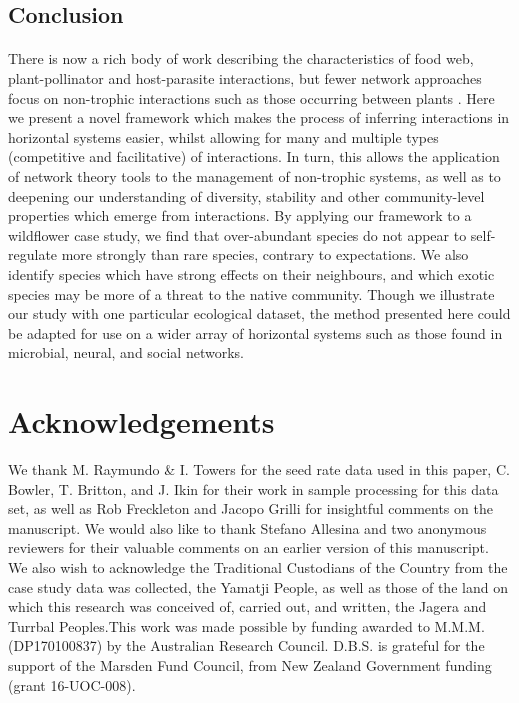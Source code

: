 \documentclass[a4,12pt]{article}
\begin{document}
\subsection{Conclusion}

    \paragraph{} 
    There is now a rich body of work describing the characteristics of food web, plant-pollinator and host-parasite interactions, but fewer network approaches focus on non-trophic interactions such as those occurring between plants \parencite{Ellison2019}. Here we present a novel framework which makes the process of inferring  interactions in horizontal systems easier, whilst allowing for many and multiple types (competitive and facilitative) of interactions. In turn, this allows the application of  network theory tools to the management of non-trophic systems, as well as to deepening our understanding of diversity, stability and other community-level properties which emerge from interactions. By applying our framework to a wildflower case study, we find that over-abundant species do not appear to self-regulate more strongly than rare species, contrary to expectations. We also identify species which have strong effects on their neighbours, and which exotic species may be more of a threat to the native community. Though we illustrate our study with one particular ecological dataset, the method presented here could be adapted for use on a wider array of  horizontal systems such as those found in microbial, neural, and social networks. 
   

% 
% 

\section*{Acknowledgements}

We thank M. Raymundo \& I. Towers for the seed rate data used in this paper, C. Bowler, T. Britton, and J. Ikin for their work in sample processing for this data set, as well as Rob Freckleton and Jacopo Grilli for insightful comments on the manuscript. We would also like to thank Stefano Allesina and two anonymous reviewers for their valuable comments on an earlier version of this manuscript. We also wish to acknowledge the Traditional Custodians of the Country from the case study data was collected, the Yamatji People, as well as those of the land on which this research was conceived of, carried out, and written, the Jagera and Turrbal Peoples.This work was made possible by funding awarded to M.M.M. (DP170100837) by the Australian Research Council. D.B.S. is grateful for the support of the Marsden Fund Council, from New Zealand Government funding (grant 16-UOC-008).
\end{document}
